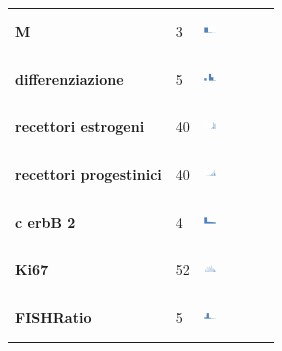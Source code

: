 \begin{table}[htbp]
\begin{tabularx}{0.7\textwidth}{lXX}
\textbf{M} & 3 & \includegraphics[width=0.2\textwidth, height=10mm]{methodology/images/m} \\
\textbf{differenziazione} & 5 & \includegraphics[width=0.2\textwidth, height=10mm]{methodology/images/differenziazione}  \\
\textbf{recettori estrogeni} & 40 & \includegraphics[width=0.2\textwidth, height=10mm]{methodology/images/recettori_estrogeni} \\
\textbf{recettori progestinici} & 40 & \includegraphics[width=0.2\textwidth, height=10mm]{methodology/images/recettori_progestinici}\\
\textbf{c erbB 2} & 4 & \includegraphics[width=0.2\textwidth, height=10mm]{methodology/images/c_erb_2}\\
\textbf{Ki67} & 52 & \includegraphics[width=0.2\textwidth, height=10mm]{methodology/images/ki67}\\
\textbf{FISHRatio} & 5 &  \includegraphics[width=0.2\textwidth, height=10mm]{methodology/images/fish}\\
\bottomrule
\end{tabularx}
\label{tab:datasetdistribution}
\end{table}

